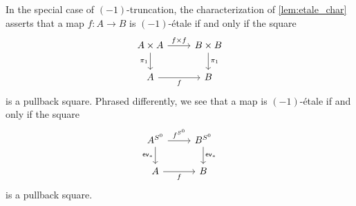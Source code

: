 \documentclass[9pt,twosided]{amsart}
\begin{document}
\begin{rmk}\label{rmk:-1etale}
In the special case of $(-1)$-truncation, the characterization of \cref{lem:etale_char} asserts that a map $f:A\to B$ is $(-1)$-\'etale if and only if the square
\begin{equation*}
\begin{tikzcd}
A\times A \arrow[d,swap,"\pi_1"] \arrow[r,"{f\times f}"] & B\times B \arrow[d,"\pi_1"] \\
A \arrow[r,swap,"f"] & B
\end{tikzcd}
\end{equation*}
is a pullback square. Phrased differently, we see that a map is $(-1)$-\'etale if and only if the square
\begin{equation*}
\begin{tikzcd}
A^{\sphere{0}} \arrow[d,swap,"\mathsf{ev}_\ast"] \arrow[r,"f^{\sphere{0}}"] & B^{\sphere{0}} \arrow[d,"\mathsf{ev}_\ast"] \\
A \arrow[r,swap,"f"] & B
\end{tikzcd}
\end{equation*}
is a pullback square.
\end{rmk}
\end{document}
